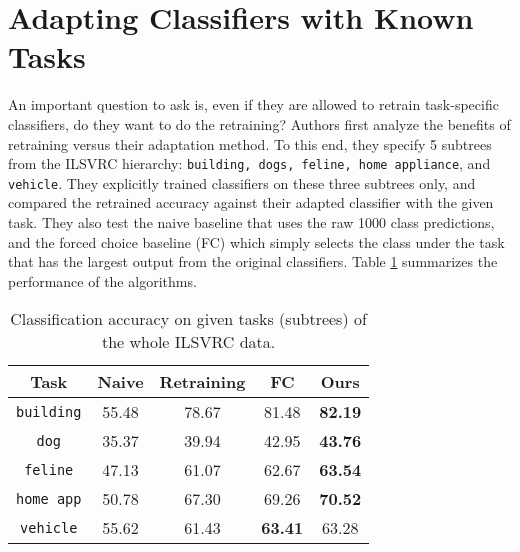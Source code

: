 \documentclass[10pt,twocolumn,letterpaper]{article}
\begin{document}
\section{Adapting Classifiers with Known Tasks}
An important question to ask is, even if they are allowed to retrain task-specific classifiers, do they want to do the retraining? Authors first analyze the benefits of retraining versus their adaptation method. To this end, they specify 5 subtrees from the ILSVRC hierarchy: {\tt building, dogs, feline, home appliance}, and {\tt vehicle}. They explicitly trained classifiers on these three subtrees only, and compared the retrained accuracy against their adapted classifier with the given task. They also test the naive baseline that uses the raw 1000 class predictions, and the forced choice baseline (FC) which simply selects the class under the task that has the largest output from the original classifiers. Table \ref{tab} summarizes the performance of the algorithms.\\
\begin{table}
\begin{center}
\begin{tabular}{c|cccc}
 \hline
 Task & Naive & Retraining & FC & Ours \\ \hline
 {\tt building} & 55.48 & 78.67 & 81.48 & {\bf 82.19} \\ 
 {\tt dog} & 35.37 & 39.94 & 42.95 & {\bf 43.76} \\
 {\tt feline} & 47.13 & 61.07 & 62.67 & {\bf 63.54} \\
 {\tt home app} & 50.78 & 67.30 & 69.26 & {\bf 70.52} \\
 {\tt vehicle} & 55.62 & 61.43 & {\bf 63.41} & 63.28 \\
 \hline
\end{tabular}
\end{center}
\caption{Classification accuracy on given tasks (subtrees) of the whole ILSVRC data.}
\label{tab}
\end{table}
{\small


}
\end{document}
